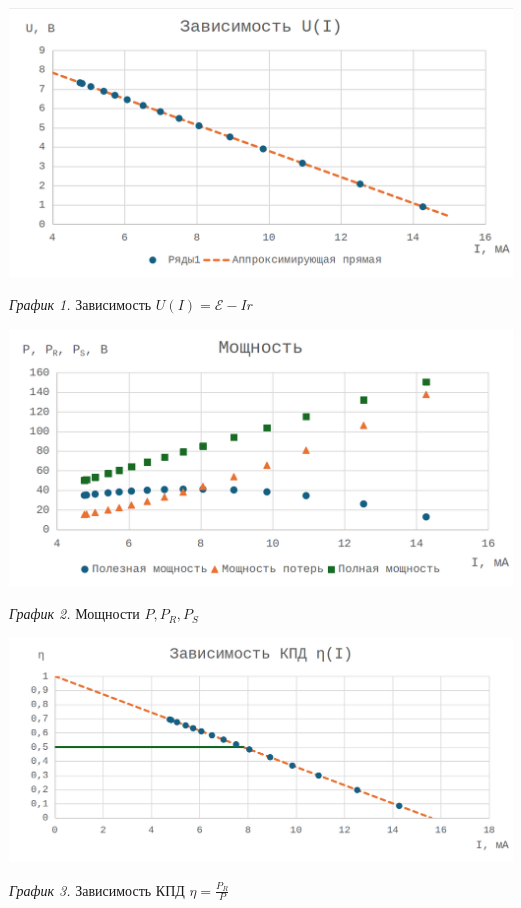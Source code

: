 \hypertarget{diagram1}{}

\begin{center}
    \includegraphics[width=15cm]{images/3.02.1.png}

    \smallvspace

    \textit{График 1.} Зависимость $U(I) = \mathscr{E} - Ir$
\end{center}

\begin{center}
    \includegraphics[width=15cm]{images/3.02.2.png}

    \smallvspace

    \textit{График 2.} Мощности $P, P_R, P_S$
\end{center}

\begin{center}
    \includegraphics[width=15cm]{images/3.02.3.png}

    \smallvspace

    \textit{График 3.} Зависимость КПД $\eta = \frac{P_R}{P}$
\end{center}
